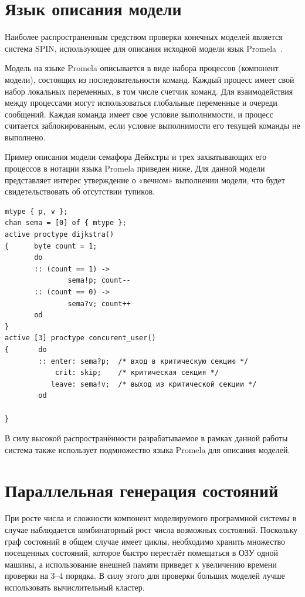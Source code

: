 \documentclass[12pt,a4paper,article]{bpm2}
\begin{document}
\section{Язык описания модели}
\label{sec:spin}

Наиболее распространенным средством проверки конечных моделей является система SPIN, использующее для описания исходной
модели язык Promela~\cite{SPIN}.

Модель на языке Promela описывается в виде набора процессов (компонент модели), состоящих из последовательности команд.
Каждый процесс имеет свой набор локальных переменных, в том числе счетчик команд.
Для взаимодействия между процессами могут использоваться глобальные переменные и очереди сообщений.
Каждая команда имеет свое условие выполнимости, и процесс считается заблокированным, если условие выполнимости его текущей команды не выполнено.

Пример описания модели семафора Дейкстры и трех захватывающих его процессов в нотации языка Promela приведен ниже.
Для данной модели представляет интерес утверждение о «вечном» выполнении модели, что будет свидетельствовать об отсутствии тупиков.

\begin{verbatim}
mtype { p, v };
chan sema = [0] of { mtype };
active proctype dijkstra()
{      byte count = 1;
       do
       :: (count == 1) ->
               sema!p; count--
       :: (count == 0) ->
               sema?v; count++
       od
}
active [3] proctype concurent_user()
{       do
        :: enter: sema?p;  /* вход в критическую секцию */
            crit: skip;    /* критическая секция */
           leave: sema!v;  /* выход из критической секции */
        od

}
\end{verbatim}

В силу высокой распространённости разрабатываемое в рамках данной работы система также использует подмножество языка Promela для описания моделей.

\section{Параллельная генерация состояний}
\label{sec:pargen}

При росте числа и сложности компонент моделируемого программной системы в случае наблюдается комбинаторный рост числа
возможных состояний.
Поскольку граф состояний в общем случае имеет циклы, необходимо хранить множество посещенных состояний, которое быстро перестаёт помещаться в ОЗУ одной машины, а использование внешней памяти приведет к увеличению времени проверки на 3--4 порядка. В силу этого для проверки больших моделей лучше использовать вычислительный кластер.
\end{document}
